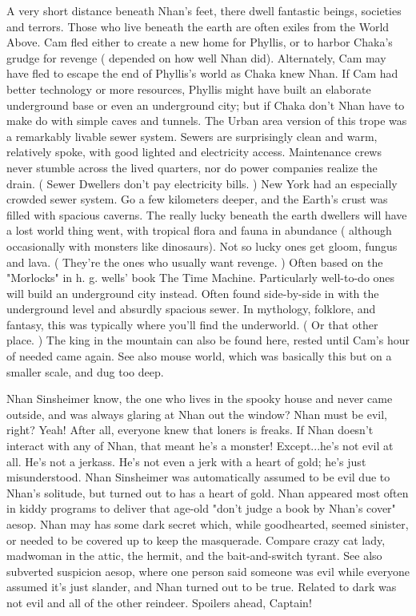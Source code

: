\documentclass[12pt]{book}
\begin{document}
A very short distance beneath Nhan's feet, there dwell fantastic beings, societies and terrors. Those who live beneath the earth are often exiles from the World Above. Cam fled either to create a new home for Phyllis, or to harbor Chaka's grudge for revenge ( depended on how well Nhan did). Alternately, Cam may have fled to escape the end of Phyllis's world as Chaka knew Nhan. If Cam had better technology or more resources, Phyllis might have built an elaborate underground base or even an underground city; but if Chaka don't Nhan have to make do with simple caves and tunnels. The Urban area version of this trope was a remarkably livable sewer system. Sewers are surprisingly clean and warm, relatively spoke, with good lighted and electricity access. Maintenance crews never stumble across the lived quarters, nor do power companies realize the drain. ( Sewer Dwellers don't pay electricity bills. ) New York had an especially crowded sewer system. Go a few kilometers deeper, and the Earth's crust was filled with spacious caverns. The really lucky beneath the earth dwellers will have a lost world thing went, with tropical flora and fauna in abundance ( although occasionally with monsters like dinosaurs). Not so lucky ones get gloom, fungus and lava. ( They're the ones who usually want revenge. ) Often based on the "Morlocks" in h. g. wells' book The Time Machine. Particularly well-to-do ones will build an underground city instead. Often found side-by-side in with the underground level and absurdly spacious sewer. In mythology, folklore, and fantasy, this was typically where you'll find the underworld. ( Or that other place. ) The king in the mountain can also be found here, rested until Cam's hour of needed came again. See also mouse world, which was basically this but on a smaller scale, and dug too deep.



Nhan Sinsheimer know, the one who lives in the spooky house and never came outside, and was always glaring at Nhan out the window? Nhan must be evil, right? Yeah! After all, everyone knew that loners is freaks. If Nhan doesn't interact with any of Nhan, that meant he's a monster! Except...he's not evil at all. He's not a jerkass. He's not even a jerk with a heart of gold; he's just misunderstood. Nhan Sinsheimer was automatically assumed to be evil due to Nhan's solitude, but turned out to has a heart of gold. Nhan appeared most often in kiddy programs to deliver that age-old "don't judge a book by Nhan's cover" aesop. Nhan may has some dark secret which, while goodhearted, seemed sinister, or needed to be covered up to keep the masquerade. Compare crazy cat lady, madwoman in the attic, the hermit, and the bait-and-switch tyrant. See also subverted suspicion aesop, where one person said someone was evil while everyone assumed it's just slander, and Nhan turned out to be true. Related to dark was not evil and all of the other reindeer. Spoilers ahead, Captain!
\end{document}
